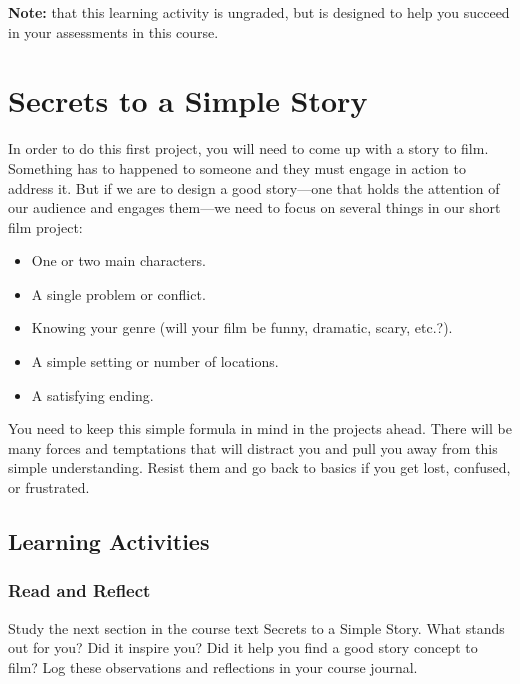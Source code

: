 \documentclass[
]{book}
\providecommand{\tightlist}{%
  \setlength{\itemsep}{0pt}\setlength{\parskip}{0pt}}
\begin{document}
\begin{caution}
\textbf{Note:} that this learning activity is ungraded, but is designed to help you succeed in your assessments in this course.
\end{caution}

\hypertarget{secrets-to-a-simple-story}{%
\section{Secrets to a Simple Story}\label{secrets-to-a-simple-story}}

In order to do this first project, you will need to come up with a story to film. Something has to happened to someone and they must engage in action to address it. But if we are to design a good story---one that holds the attention of our audience and engages them---we need to focus on several things in our short film project:

\begin{itemize}
\tightlist
\item
  One or two main characters.\\
\item
  A single problem or conflict.\\
\item
  Knowing your genre (will your film be funny, dramatic, scary, etc.?).\\
\item
  A simple setting or number of locations.\\
\item
  A satisfying ending.
\end{itemize}

You need to keep this simple formula in mind in the projects ahead. There will be many forces and temptations that will distract you and pull you away from this simple understanding. Resist them and go back to basics if you get lost, confused, or frustrated.

\hypertarget{learning-activities-19}{%
\subsection*{Learning Activities}\label{learning-activities-19}}

\begin{reflect}
\hypertarget{read-and-reflect-1}{%
\subsubsection*{Read and Reflect}\label{read-and-reflect-1}}

Study the next section in the course text Secrets to a Simple Story. What stands out for you? Did it inspire you? Did it help you find a good story concept to film? Log these observations and reflections in your course journal.
\end{reflect}
\end{document}

